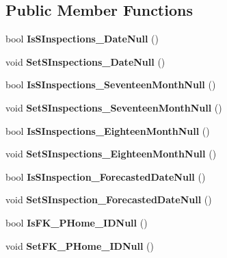 \subsection*{Public Member Functions}
\begin{DoxyCompactItemize}
\item 
\mbox{\label{class_a_f_h___scheduler_1_1_home_inspection_data_set_1_1_scheduled___inspections_row_a94f8df922e9eb719a2fe3512b9468675}} 
bool {\bfseries Is\+S\+Inspections\+\_\+\+Date\+Null} ()
\item 
\mbox{\label{class_a_f_h___scheduler_1_1_home_inspection_data_set_1_1_scheduled___inspections_row_a6ca59ab8d7f42424082c31684f995ad4}} 
void {\bfseries Set\+S\+Inspections\+\_\+\+Date\+Null} ()
\item 
\mbox{\label{class_a_f_h___scheduler_1_1_home_inspection_data_set_1_1_scheduled___inspections_row_abf38d1259e8f7178518db5c29802386d}} 
bool {\bfseries Is\+S\+Inspections\+\_\+\+Seventeen\+Month\+Null} ()
\item 
\mbox{\label{class_a_f_h___scheduler_1_1_home_inspection_data_set_1_1_scheduled___inspections_row_a9aafc4003835e26e90983be51cfd594d}} 
void {\bfseries Set\+S\+Inspections\+\_\+\+Seventeen\+Month\+Null} ()
\item 
\mbox{\label{class_a_f_h___scheduler_1_1_home_inspection_data_set_1_1_scheduled___inspections_row_ac231f955ad6d536cb8bd5b53c425bdff}} 
bool {\bfseries Is\+S\+Inspections\+\_\+\+Eighteen\+Month\+Null} ()
\item 
\mbox{\label{class_a_f_h___scheduler_1_1_home_inspection_data_set_1_1_scheduled___inspections_row_acf374035d4436412b5c2b59617a67565}} 
void {\bfseries Set\+S\+Inspections\+\_\+\+Eighteen\+Month\+Null} ()
\item 
\mbox{\label{class_a_f_h___scheduler_1_1_home_inspection_data_set_1_1_scheduled___inspections_row_afc7b332632fb3fd01bca4f76bfc917d5}} 
bool {\bfseries Is\+S\+Inspection\+\_\+\+Forecasted\+Date\+Null} ()
\item 
\mbox{\label{class_a_f_h___scheduler_1_1_home_inspection_data_set_1_1_scheduled___inspections_row_a3b0a00d5912d1c273de4b1bc647ae9ea}} 
void {\bfseries Set\+S\+Inspection\+\_\+\+Forecasted\+Date\+Null} ()
\item 
\mbox{\label{class_a_f_h___scheduler_1_1_home_inspection_data_set_1_1_scheduled___inspections_row_a9cc9e1d351bf1cdefce387afe60483fb}} 
bool {\bfseries Is\+F\+K\+\_\+\+P\+Home\+\_\+\+I\+D\+Null} ()
\item 
\mbox{\label{class_a_f_h___scheduler_1_1_home_inspection_data_set_1_1_scheduled___inspections_row_a49773532f33037044c3cbbba9574ed06}} 
void {\bfseries Set\+F\+K\+\_\+\+P\+Home\+\_\+\+I\+D\+Null} ()
\end{DoxyCompactItemize}
